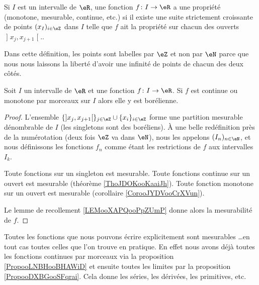 \begin{definition}
Si \( I\) est un intervalle de \( \eR\), une fonction \( f\colon I\to \eR\) a une propriété (monotone, mesurable, continue, etc.)  si il existe une suite strictement croissante de points \( (x_I)_{i\in \eZ}\) dans \( I\) telle que \( f\) ait la propriété sur chacun des ouverts \( \mathopen] x_j ,x_{j+1} \mathclose[.\).
\end{definition}
Dans cette définition, les points sont labelles par \( \eZ\) et non par \( \eN\) parce que nous nous laissons la liberté d'avoir une infinité de points de chacun des deux côtés.

\begin{proposition}     \label{PropooLNBHooBHAWiD}
    Soit \( I\) un intervalle de \( \eR\) et une fonction \( f\colon I\to \eR\). Si \( f\) est continue ou monotone par morceaux sur \( I\) alors elle y est borélienne.
\end{proposition}

\begin{proof}
L'ensemble \( \{  \mathopen] x_j , x_{j+1} \mathclose[  \}_{j\in \eZ}\cup\{ x_i \}_{i\in \eZ}\) forme une partition mesurable dénombrable de \( I\) (les singletons sont des boréliens). À une belle redéfinition près de la numérotation (deux fois \( \eZ\) va dans \( \eN\)), nous les appelons \( (I_n)_{n\in \eN}\), et nous définissons les fonctions \( f_n\) comme étant les restrictions de \( f\) aux intervalles \( I_k\).

    Toute fonctions sur un singleton est mesurable. Toute fonctions continue sur un ouvert est mesurable (théorème \ref{ThoJDOKooKaaiJh}). Toute fonction monotone sur un ouvert est mesurable (corollaire \ref{CorooJYDVooCrXVun}).

    Le lemme de recollement \ref{LEMooXAPQooPpZUmP} donne alors la mesurabilité de \( f\).
\end{proof}

\begin{normaltext}
    Toutes les fonctions que nous pouvons écrire explicitement sont mesurables \ldots en tout cas toutes celles que l'on trouve en pratique. En effet nous avons déjà toutes les fonctions continues par morceaux via la proposition \ref{PropooLNBHooBHAWiD} et ensuite toutes les limites par la proposition \ref{PropooDXBGooSFqrai}. Cela donne les séries, les dérivées, les primitives, etc.
\end{normaltext}
